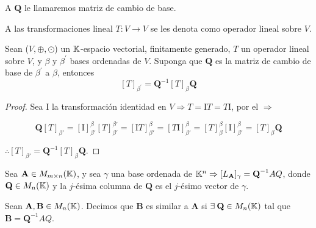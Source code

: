 \begin{notation}
    A $\textbf{Q}$ le llamaremos matriz de cambio de base.
\end{notation}

\begin{definition} 
    A las transformaciones lineal $T:V \to V$ se les denota como operador lineal sobre $V$.
\end{definition}

\begin{theorem}
    Sean ($V, \oplus, \odot$) un $\mathbb{K}$-espacio vectorial, finitamente generado, $T$ un operador lineal sobre $V$, y $\beta$ y ${\beta}^{\prime}$ bases ordenadas de $V$. Suponga que $\textbf{Q}$ es la matriz de cambio de base de ${\beta}^{\prime}$ a $\beta$, entonces $$[T]_{{\beta}^{\prime}}={\textbf{Q}}^{-1}[T]_{\beta}\textbf{Q}$$
\end{theorem}

\begin{proof}
    Sea $\mathrm{I}$ la transformación identidad en $V \Rightarrow T=\mathrm{I}T=T\mathrm{I}$, por el  $\Rightarrow$
    
    $$\textbf{Q}[T]_{\beta'}=[\mathrm{I}]_{\beta'}^{\beta}[T]_{\beta'}^{\beta'}=[\mathrm{I}T]_{\beta'}^{\beta}=[T\mathrm{I}]_{\beta'}^{\beta}=[T]_{\beta}^{\beta}[\mathrm{I}]_{\beta'}^{\beta}=[T]_{\beta}\textbf{Q}$$ 
    
    $\therefore [T]_{\beta'}={\textbf{Q}}^{-1}[T]_{\beta}\textbf{Q}$.
\end{proof}

\begin{corollary}
    Sea $\textbf{A} \in M_{m \times n}(\mathbb{K})$, y sea $\gamma$ una base ordenada de $\mathbb{K}^n \Rightarrow [L_{\textbf{A}}]_{\gamma}={\textbf{Q}}^{-1}AQ$, donde $\textbf{Q} \in M_n(\mathbb{K})$ y la $j$-ésima columna de $\textbf{Q}$ es el $j$-ésimo vector de $\gamma$.
\end{corollary}

\begin{definition} 
    Sean $\textbf{A},\textbf{B} \in M_n(\mathbb{K})$. Decimos que $\textbf{B}$ es similar a $\textbf{A}$ si $\exists \: \textbf{Q} \in M_n(\mathbb{K})$ tal que $\textbf{B}={\textbf{Q}}^{-1}AQ$. 
\end{definition}